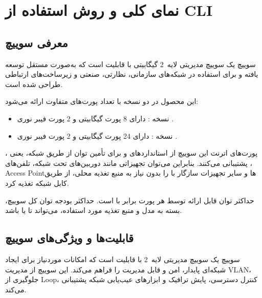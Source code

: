 \documentclass[11pt,letterpaper]{report}
\begin{document}
	\clearpage
	\tableofcontents
	\clearpage


	\chapter{نمای کلی و روش استفاده از CLI}

	\section{معرفی سوییچ }
		
		سوییچ  یک سوییچ مدیریتی لایه~2 گیگابیتی با قابلیت
		 است که به‌صورت مستقل توسعه یافته و برای استفاده در شبکه‌های
		سازمانی، نظارتی، صنعتی و زیرساخت‌های ارتباطی طراحی شده است.
		
		این محصول در دو نسخه با تعداد پورت‌های متفاوت ارائه می‌شود:
		
		\begin{itemize}
			\item نسخه : دارای 8 پورت گیگابیتی 
			و 2 پورت فیبر نوری .
			
			\item نسخه : دارای 24 پورت گیگابیتی 
			و 2 پورت فیبر نوری .
		\end{itemize}
		
		پورت‌های اترنت این سوییچ از استانداردهای  و
		 برای تأمین توان از طریق شبکه، یعنی ،
		پشتیبانی می‌کنند. بنابراین می‌توان تجهیزاتی مانند دوربین‌های تحت شبکه،
		تلفن‌های ، Access Pointها و سایر تجهیزات سازگار با  را
		بدون نیاز به منبع تغذیه محلی، از طریق کابل شبکه تغذیه کرد.
		
		حداکثر توان قابل ارائه توسط هر پورت  برابر با  است.
		حداکثر بودجه توان  کل سوییچ، بسته به مدل و منبع تغذیه مورد
		استفاده، می‌تواند تا  یا  باشد.
		
		

	\section{قابلیت‌ها و ویژگی‌های سوییچ}
	
	سوییچ  یک سوییچ مدیریتی لایه~2 با قابلیت  است که
	امکانات موردنیاز برای ایجاد شبکه‌ای پایدار، امن و قابل مدیریت را فراهم
	می‌کند. این سوییچ از مدیریت VLAN، جلوگیری از Loop، کنترل دسترسی،
	پایش ترافیک و ابزارهای عیب‌یابی شبکه پشتیبانی می‌کند.
	
\end{document}
